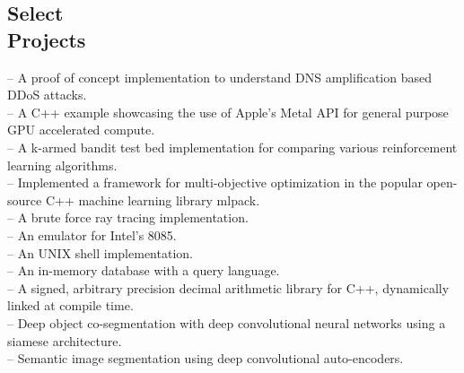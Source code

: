 \documentclass[mm]{simple_style}
\begin{document}
\begin{resume}
\vspace{-2ex}
\sectionline


\section{Select\\Projects}

\href{https://github.com/say4n/dns.amplify}{} -- A proof of concept implementation to understand DNS amplification based DDoS attacks.\\
\href{https://github.com/say4n/metal.compute}{} -- A C++ example showcasing the use of Apple's Metal API for general purpose GPU accelerated compute.\\
\href{https://github.com/say4n/bandit.rl}{} -- A k-armed bandit test bed implementation for comparing various reinforcement learning algorithms.\\
\href{https://github.com/mlpack/ensmallen}{} -- Implemented a framework for multi-objective optimization in the popular open-source C++ machine learning library mlpack.\\
\href{https://github.com/say4n/rtx.go}{} -- A brute force ray tracing implementation.\\
\href{https://github.com/say4n/eightyfive}{} -- An emulator for Intel’s 8085.\\
\href{https://github.com/say4n/ysh}{} -- An UNIX shell implementation.\\
\href{https://github.com/say4n/gobi}{} -- An in-memory database with a query language.\\
\href{https://github.com/say4n/infinity}{} -- A signed, arbitrary precision decimal arithmetic library for C++, dynamically linked at compile time.\\
\href{https://github.com/say4n/deepcosegmentation.pytorch}{} – Deep object co-segmentation with deep convolutional neural networks using a siamese architecture.\\
\href{https://github.com/say4n/pytorch-segnet}{} -- Semantic image segmentation using deep convolutional auto-encoders.\\

\end{resume}
\end{document}
